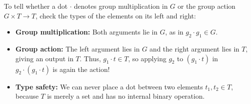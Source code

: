 \begin{content}

\begin{steps}
To tell whether a dot $\cdot$ denotes group multiplication in $G$ or the group action $G \times T \to T$, check the types of the elements on its left and right:
\begin{itemize}
    \item \textbf{Group multiplication:} Both arguments lie in $G$, as in $g_2 \cdot g_1 \in G$.
    \item \textbf{Group action:} The left argument lies in $G$ and the right argument lies in $T$, giving an output in $T$. Thus, $g_1 \cdot t \in T$, so applying $g_2$ to $(g_1 \cdot t)$ in $g_2 \cdot (g_1 \cdot t)$ is again the action!
    \item \textbf{Type safety:} We can never place a dot between two elements $t_1, t_2 \in T$, because $T$ is merely a set and has no internal binary operation.
\end{itemize}
\end{steps}
\end{content}

\begin{hidden}
\end{hidden}

